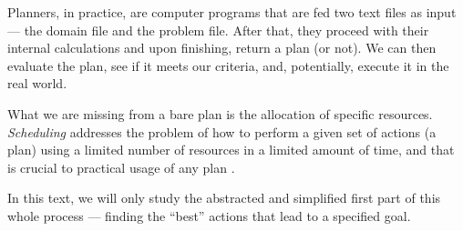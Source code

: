 Planners, in practice, are computer programs that are fed two text files as input
--- the domain file and the problem file. After that, they proceed with their internal calculations
and upon finishing, return a plan (or not). 
We can then evaluate the plan, see if it meets our criteria, and, potentially,
execute it in the real world.

What we are missing from a bare plan is the allocation of specific resources.
\textit{Scheduling} addresses the problem of how to perform a given set of actions (a plan)
using a limited number of resources in a limited amount of time, and
that is crucial to practical usage of any plan \citep[Chapter~15]{Ghallab2004}.

In this text, we will only study the abstracted and simplified first part of this whole process
--- finding the ``best'' actions that lead to a specified goal.


















